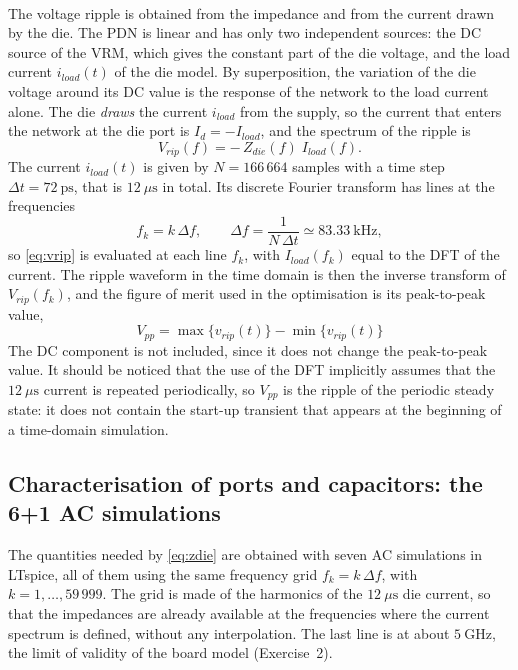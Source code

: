 \noindent\\ The voltage ripple is obtained from the impedance and from the current drawn by the die. The PDN is linear and has only two independent sources:
the DC source of the VRM, which gives the constant part of the die voltage, and the load current $i_{load}(t)$ of the die model. By superposition, the
variation of the die voltage around its DC value is the response of the network to the load current alone. The die \textit{draws} the current $i_{load}$
from the supply, so the current that enters the network at the die port is $I_d = -I_{load}$, and the spectrum of the ripple is
\begin{equation}
  V_{rip}(f) = -\,Z_{die}(f)\;I_{load}(f).
  \label{eq:vrip}
\end{equation}
The current $i_{load}(t)$ is given by $N = 166\,664$ samples with a time step $\Delta t = 72~\text{ps}$, that is $12~\mu\text{s}$ in total. Its discrete
Fourier transform has lines at the frequencies
\begin{equation}
  f_k = k\,\Delta f, \qquad \Delta f = \frac{1}{N\,\Delta t} \simeq 83.33~\text{kHz},
\end{equation}
so \eqref{eq:vrip} is evaluated at each line $f_k$, with $I_{load}(f_k)$ equal to the DFT of the current. The ripple waveform in the time
domain is then the inverse transform of $V_{rip}(f_k)$, and the figure of merit used in the optimisation is its peak-to-peak value,
\begin{equation}
  V_{pp} = \max\{v_{rip}(t)\} - \min\{v_{rip}(t)\}
\end{equation}
The DC component is not included, since it does not change the peak-to-peak value. It should be noticed that the use of the DFT implicitly assumes that the
$12~\mu\text{s}$ current is repeated periodically, so $V_{pp}$ is the ripple of the periodic steady state: it does not contain the start-up transient that
appears at the beginning of a time-domain simulation.


\subsection{Characterisation of ports and capacitors: the 6+1 AC simulations}

The quantities needed by \eqref{eq:zdie} are obtained with seven AC simulations in LTspice, all of them using the same frequency grid $f_k = k\,\Delta f$, with
$k = 1,\dots,59\,999$. The grid is made of the harmonics of the $12~\mu\text{s}$ die current, so that the impedances are already available at the frequencies
where the current spectrum is defined, without any interpolation. The last line is at about $5~\text{GHz}$, the limit of validity of the board model
(Exercise~2).


